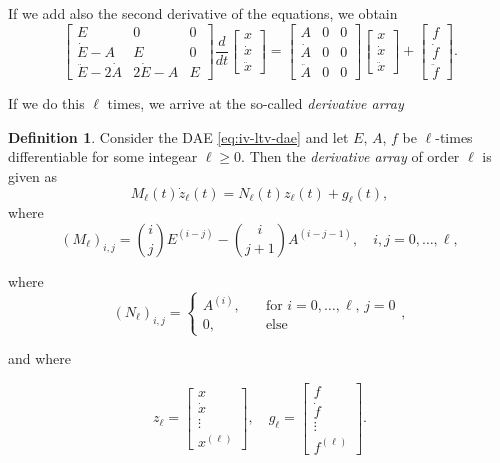 \documentclass[]{book}
\theoremstyle{definition}
\newtheorem{definition}{Definition}[chapter]
\theoremstyle{definition}
\theoremstyle{definition}
\theoremstyle{definition}
\theoremstyle{remark}
\begin{document}
If we add also the second derivative of the equations, we obtain
\[
\begin{bmatrix}
E & 0 & 0\\
\dot E - A & E &0  \\
\ddot E - 2\dot A & 2\dot E -A &E
\end{bmatrix}
\frac{d}{dt}
\begin{bmatrix}
x \\ \dot x \\ \ddot x
\end{bmatrix} =
\begin{bmatrix}
A & 0 & 0\\
\dot A & 0 & 0\\
\ddot A & 0  & 0
\end{bmatrix}
\begin{bmatrix}
x \\ \dot x \\ \ddot x
\end{bmatrix}
+
\begin{bmatrix}
f \\ \dot f \\ \ddot f
\end{bmatrix}.
\]

If we do this \(\ell\) times, we arrive at the so-called \emph{derivative array}
\begin{definition}
\protect\hypertarget{def:iv-derivative-array}{}{\label{def:iv-derivative-array} }Consider the DAE \eqref{eq:iv-ltv-dae} and let \(E\), \(A\), \(f\) be \(\ell\)-times differentiable for some integear \(\ell\geq 0\). Then the \emph{derivative array} of order \(\ell\) is given as
\begin{equation}
M_\ell (t) \dot z_\ell(t) = N_\ell (t) z_\ell(t) + g_\ell(t),
\end{equation}
where
\[
(M_\ell)_{i,j} = \binom{i}{j}E^{(i-j)} - \binom{i}{j+1}A^{(i-j-1)}, \quad i,j=0,\dotsc,\ell,
\]

where
\[
(N_\ell)_{i,j} = 
\begin{cases}
A^{(i)}, \quad &\text{for } i=0,\dotsc, \ell, \, j=0 \\
0, \quad & \text{else}
\end{cases},
\]

and where

\[
z_\ell = \begin{bmatrix}
x \\ \dot x \\ \vdots \\ x^{(\ell)}
\end{bmatrix}, \quad
g_\ell = \begin{bmatrix}
f \\ \dot f \\ \vdots \\ f^{(\ell)}
\end{bmatrix}.
\]
\end{definition}
\end{document}
